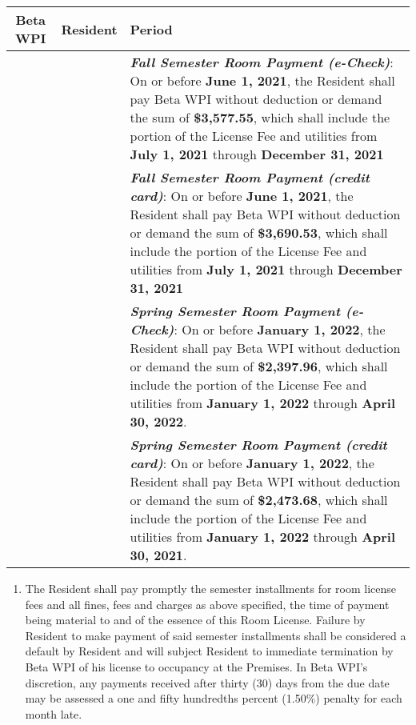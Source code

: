 \documentclass[12pt]{article}
\begin{document}
\begin{enumerate}
\begin{tabular}{|c|c|p{4in}|} \toprule
        Beta WPI & Resident & Period \\ \midrule
                 & & \textbf{\textit{Fall Semester Room Payment (e-Check)}}: On or before \textbf{June 1, 2021}, the Resident shall pay Beta WPI without deduction or demand the sum of \textbf{\$3,577.55}, which shall include the portion of the License Fee and utilities from \textbf{July 1, 2021} through \textbf{December 31, 2021} \\ \midrule
                 & & \textbf{\textit{Fall Semester Room Payment (credit card)}}: On or before \textbf{June 1, 2021}, the Resident shall pay Beta WPI without deduction or demand the sum of \textbf{\$3,690.53}, which shall include the portion of the License Fee and utilities from \textbf{July 1, 2021} through \textbf{December 31, 2021} \\ \midrule
                 & & \textbf{\textit{Spring Semester Room Payment (e-Check)}}: On or before \textbf{January 1, 2022}, the Resident shall pay Beta WPI without deduction or demand the sum of \textbf{\$2,397.96}, which shall include the portion of the License Fee and utilities from \textbf{January 1, 2022} through \textbf{April 30, 2022}.\\ \midrule
                 & & \textbf{\textit{Spring Semester Room Payment (credit card)}}: On or before \textbf{January 1, 2022}, the Resident shall pay Beta WPI without deduction or demand the sum of \textbf{\$2,473.68}, which shall include the portion of the License Fee and utilities from \textbf{January 1, 2022} through \textbf{April 30, 2021}.\\ \bottomrule
\end{tabular}

\begin{enumerate}[label=\Alph*.]

\item The Resident shall pay promptly the semester installments for room license fees and all fines, fees and charges as above specified, the time of payment being material to and of the essence of this Room License.
Failure by Resident to make payment of said semester installments shall be considered a default by Resident and will subject Resident to immediate termination by Beta WPI of his license to occupancy at the Premises.
In Beta WPI’s discretion, any payments received after thirty (30) days from the due date may be assessed a one and fifty hundredths percent (1.50\%) penalty for each month late.


\end{enumerate}
\end{enumerate}
\end{document}
